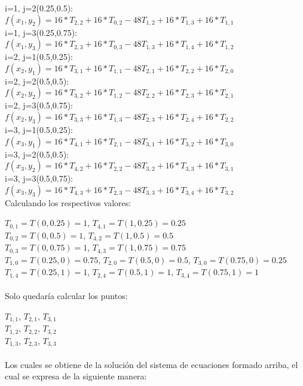 i=1, j=2(0.25,0.5):\\
$f(x_1,y_2) = 16*T_{2,2} + 16*T_{0,2} - 48 T_{1,2} + 16*T_{1,3} + 16*T_{1,1}$\\

i=1, j=3(0.25,0.75):\\
$f(x_1,y_3) = 16*T_{2,3} + 16*T_{0,3} - 48 T_{1,3} + 16*T_{1,4} + 16*T_{1,2}$\\

i=2, j=1(0.5,0.25):\\
$f(x_2,y_1) = 16*T_{3,1} + 16*T_{1,1} - 48 T_{2,1} + 16*T_{2,2} + 16*T_{2,0}$\\

i=2, j=2(0.5,0.5):\\
$f(x_2,y_2) = 16*T_{3,2} + 16*T_{1,2} - 48 T_{2,2} + 16*T_{2,3} + 16*T_{2,1}$\\

i=2, j=3(0.5,0.75):\\
$f(x_2,y_3) = 16*T_{3,3} + 16*T_{1,3} - 48 T_{2,3} + 16*T_{2,4} + 16*T_{2,2}$\\

i=3, j=1(0.5,0.25):\\
$f(x_3,y_1) = 16*T_{4,1} + 16*T_{2,1} - 48 T_{3,1} + 16*T_{3,2} + 16*T_{3,0}$\\

i=3, j=2(0.5,0.5):\\
$f(x_3,y_2) = 16*T_{4,2} + 16*T_{2,2} - 48 T_{3,2} + 16*T_{3,3} + 16*T_{3,1}$\\

i=3, j=3(0.5,0.75):\\
$f(x_3,y_3) = 16*T_{4,3} + 16*T_{2,3} - 48 T_{3,3} + 16*T_{3,4} + 16*T_{3,2}$\\

Calculando los respectivos valores:

$T_{0,1} = T(0, 0.25) = 1 $, $T_{4,1} = T(1,0.25) = 0.25$\\
$T_{0,2} = T(0, 0.5) = 1$, $T_{4,2} = T(1,0.5) = 0.5 $\\
$T_{0,3} = T(0, 0.75) = 1$, $T_{4,3} = T(1,0.75) = 0.75 $\\
$T_{1,0} = T(0.25, 0) = 0.75$, $T_{2,0} = T(0.5, 0) = 0.5$, $T_{3,0} = T(0.75, 0) = 0.25$\\
$T_{1,4} = T(0.25, 1) = 1$, $T_{2,4} = T(0.5,1) = 1$, $T_{3,4} = T(0.75,1) = 1$\\
\\Solo quedaría calcular los puntos:

$T_{1,1} $, $T_{2,1} $, $T_{3,1} $\\
$T_{1,2}$, $T_{2,2} $, $T_{3,2} $\\
$T_{1,3} $, $T_{2,3} $, $T_{3,3} $\\
\\Los cuales se obtiene de la solución del sistema de ecuaciones formado arriba, el cual se expresa de la siguiente manera:

